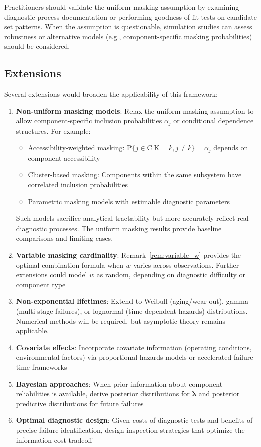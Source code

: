 \documentclass[12pt]{article}
\newcommand{\RV}[1]{\mathrm{#1}}
\newcommand{\Prob}[1]{\mathrm{P}\{#1\}}
\newcommand{\cand}{\RV{C}}         %
\renewcommand{\vec}[1]{\boldsymbol{#1}}
\theoremstyle{definition}
\theoremstyle{remark}
\begin{document}
Practitioners should validate the uniform masking assumption by examining diagnostic process documentation or performing goodness-of-fit tests on candidate set patterns. When the assumption is questionable, simulation studies can assess robustness or alternative models (e.g., component-specific masking probabilities) should be considered.

\subsection{Extensions}

Several extensions would broaden the applicability of this framework:

\begin{enumerate}
\item \textbf{Non-uniform masking models}: Relax the uniform masking assumption to allow component-specific inclusion probabilities $\alpha_j$ or conditional dependence structures. For example:
\begin{itemize}
\item Accessibility-weighted masking: $\Prob{j \in \cand | \RV{K} = k, j \neq k} = \alpha_j$ depends on component accessibility
\item Cluster-based masking: Components within the same subsystem have correlated inclusion probabilities
\item Parametric masking models with estimable diagnostic parameters
\end{itemize}
Such models sacrifice analytical tractability but more accurately reflect real diagnostic processes. The uniform masking results provide baseline comparisons and limiting cases.

\item \textbf{Variable masking cardinality}: Remark~\ref{rem:variable_w} provides the optimal combination formula when $w$ varies across observations. Further extensions could model $w$ as random, depending on diagnostic difficulty or component type

\item \textbf{Non-exponential lifetimes}: Extend to Weibull (aging/wear-out), gamma (multi-stage failures), or lognormal (time-dependent hazards) distributions. Numerical methods will be required, but asymptotic theory remains applicable.

\item \textbf{Covariate effects}: Incorporate covariate information (operating conditions, environmental factors) via proportional hazards models or accelerated failure time frameworks

\item \textbf{Bayesian approaches}: When prior information about component reliabilities is available, derive posterior distributions for $\vec{\lambda}$ and posterior predictive distributions for future failures

\item \textbf{Optimal diagnostic design}: Given costs of diagnostic tests and benefits of precise failure identification, design inspection strategies that optimize the information-cost tradeoff
\end{enumerate}
\end{document}
